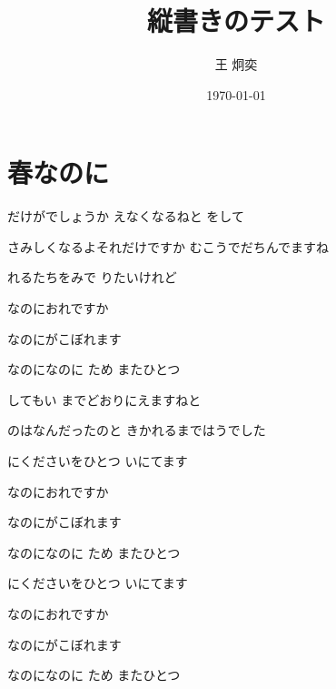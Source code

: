 \documentclass{jlreq}
\title{縦書きのテスト}
\author{王 炯奕}
\date{\today}
\begin{document}
\maketitle

\section{春なのに}

だけが\quad{}でしょうか\quad
{}えなくなるねと をして


さみしくなるよ\quad それだけですか\quad
むこうでだち\quad {}んでますね

れるたちを\quad{}みで\quad
{}りたいけれど
\vspace{1em}

なのに\quad おれですか

なのに\quad {}がこぼれます

なのに\quad {}なのに\quad
ため またひとつ
\vspace{1em}

しても\quad {}い\quad
{}までどおりに\quad {}えますねと

のは\quad なんだったのと\quad
きかれるまでは\quad {}うでした

にください\quad {}をひとつ\quad
{}いに\quad {}てます
\vspace{1em}

なのに\quad おれですか

なのに\quad {}がこぼれます

なのに\quad {}なのに\quad
ため またひとつ
\vspace{1em}

にください\quad {}をひとつ\quad
{}いに\quad {}てます
\vspace{1em}

なのに\quad おれですか\quad

なのに\quad {}がこぼれます

なのに\quad {}なのに\quad
ため またひとつ
\end{document}
